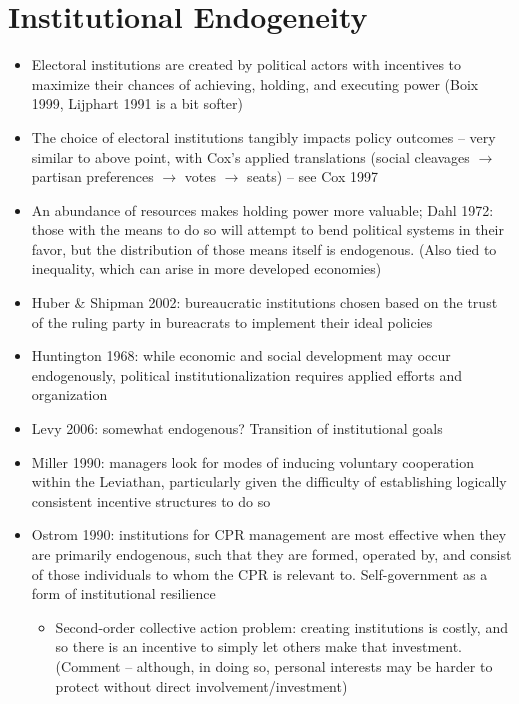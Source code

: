 \documentclass[12pt]{article}
\begin{document}
\section*{Institutional Endogeneity}


\begin{itemize}
    \item Electoral institutions are created by political actors with incentives to maximize their chances of achieving, holding, and executing power (Boix 1999, Lijphart 1991 is a bit softer)
    \item The choice of electoral institutions tangibly impacts policy outcomes -- very similar to above point, with Cox's applied translations (social cleavages $\rightarrow$ partisan preferences $\rightarrow$ votes $\rightarrow$ seats) -- see Cox 1997 
    \item An abundance of resources makes holding power more valuable; Dahl 1972: those with the means to do so will attempt to bend political systems in their favor, but the distribution of those means itself is endogenous. (Also tied to inequality, which can arise in more developed economies)
    \item Huber \& Shipman 2002: bureaucratic institutions chosen based on the trust of the ruling party in bureacrats to implement their ideal policies
    \item Huntington 1968: while economic and social development may occur endogenously, political institutionalization requires applied efforts and organization
    \item Levy 2006: somewhat endogenous? Transition of institutional goals
    \item Miller 1990: managers look for modes of inducing voluntary cooperation within the Leviathan, particularly given the difficulty of establishing logically consistent incentive structures to do so
    \item Ostrom 1990: institutions for CPR management are most effective when they are primarily endogenous, such that they are formed, operated by, and consist of those individuals to whom the CPR is relevant to. Self-government as a form of institutional resilience
    \begin{itemize}
        \item Second-order collective action problem: creating institutions is costly, and so there is an incentive to simply let others make that investment. (Comment -- although, in doing so, personal interests may be harder to protect without direct involvement/investment)

\end{itemize}
\end{itemize}
\end{document}
